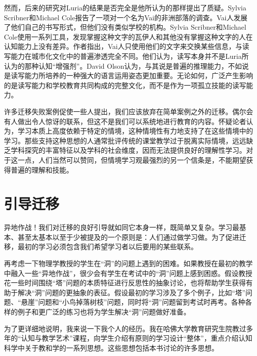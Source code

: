 然而，后来的研究对Luria的结果是否完全是他所认为的那样提出了质疑。Sylvia Scribner和Michael Cole报告了一项对一个名为Vai的非洲部落的调查。Vai人发展了他们自己的书写形式，但他们没有类似学校的机构。Sylvia Scribner和Michael Cole使用一系列工具，发现掌握这种文字的瓦伊人和其他没有掌握这种文字的人在认知能力上没有差异。作者指出，Vai人只使用他们的文字来交换某些信息，与读写能力在城市化文化中的普遍渗透完全不同。他们认为，读写本身并不是Luria所认为的那种认知“增强剂”。David Olson认为，与其说是普遍的推理能力，不如说是读写能力所培养的一种强大的语言运用姿态更加重要。无论如何，广泛产生影响的是读写能力和学校教育共同构成的完整文化，而不是作为一项孤立技能的读写能力。

许多迁移失败案例促使一些人提出，我们应该放弃在简单案例之外的迁移。偶尔会有人做出令人惊讶的联系，但这不是我们可以系统地进行教育的内容。怀疑论者认为，学习本质上高度依赖于特定的情境，这种情境性有力地支持了在这些情境中的学习。那些支持这种思想的人通常批评传统的课堂教学过于脱离实际情境，远远缺乏学科探究的丰富特征以及学科的社会维度，因而无法提供良好的理解性学习。对于这一点，人们当然可以赞同，但情境学习观最强烈的另一个信条是，不能期望获得普遍的理解和技能。

\section*{引导迁移}

异地作战！我们对迁移的良好引导就如同它本身一样，既简单又复杂。学习最基本、甚至太基本以至于少被提及的一个原则是：人们通过做学习做。为了促进迁移，最初的学习必须包含我们希望学习者以后要用的某些联系。

再考虑一下物理学教授的学生在“洞”的问题上遇到的困难。如果教授在最初的教学中融入一些“异地作战”，很少会有学生在考试中的“洞”问题上感到困惑。假设教授花一些时间围绕“塔”问题的本质特征进行反思性的抽象讨论，也将帮助学生获得有助于解决“洞”问题的更抽象的表征。假设最初的学习涉及了多个例子，比如“塔”问题、“悬崖”问题和“小鸟掉落树枝”问题，同时将“洞”问题留到考试时再考。各种各样的例子和更广泛的练习也将为学生解决“洞”问题做好准备。

为了更详细地说明，我来说一下我个人的经历。我在哈佛大学教育研究生院教过多年的“认知与教学艺术”课程，向学生介绍有原则的学习设计“整体”，重点介绍认知科学中关于教和学的一系列思想。这些思想包括本书讨论的许多思想。

